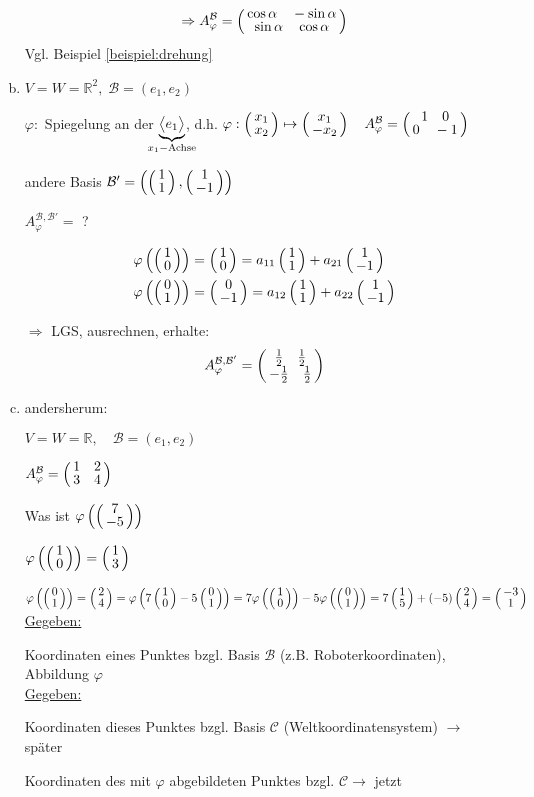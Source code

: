 \begin{enumerate}[a)]
	\[\Rightarrow A_\varphi^\mathcal{B} = \weirdvct{\cos \alpha \quad -\sin \alpha}{\sin \alpha\quad \cos \alpha}\]
	Vgl. Beispiel \ref{beispiel:drehung}
	
	\item
	$V=W=\mathbb{R}^2,\; \mathcal{B} = (e_1,e_2)$
	
	$\varphi:$ Spiegelung an der $\underbrace{\big<e_1\big>}_{\mathclap{x_1-\text{Achse}}}$, d.h. $\varphi:\weirdvct{x_1}{x_2}\mapsto \weirdvct{x_1}{-x_2}\quad
	A_\varphi^\mathcal{B} = \weirdvct{1\quad0}{0\quad-1}$
	
	andere Basis $\mathcal{B}' = \left( \weirdvct{1}{1},\weirdvct{1}{-1} \right)$
	
	$A_\varphi^{\mathcal{B},\mathcal{B}'} =$ ?
	
	\begin{align*}
	\varphi\left(\weirdvct{1}{0}\right) &= \weirdvct{1}{0} = a_{11}\weirdvct{1}{1} + a_{21}\weirdvct{1}{-1}\\
	\varphi\left(\weirdvct{0}{1}\right) &= \weirdvct{0}{-1} = a_{12}\weirdvct{1}{1} + a_{22}\weirdvct{1}{-1}\\
	\end{align*}
	
	$\Rightarrow$ LGS, ausrechnen, erhalte:
	\[A_\varphi^{\mathcal{B},\mathcal{B}'} = \weirdvct{\frac{1}{2}\quad \frac{1}{2}}{-\frac{1}{2}\quad \frac{1}{2}}\]
	
	\item
	andersherum:
	
	$V=W=\mathbb{R}, \quad \mathcal{B}=(e_1,e_2)$
	
	$A_\varphi^\mathcal{B} = \weirdvct{1\quad2}{3\quad4}$
	
	Was ist $\varphi\left(\weirdvct{7}{-5}\right)$
	
	$\varphi\left(\weirdvct{1}{0}\right) = \weirdvct{1}{3}$
	
	$\varphi\left(\weirdvct{0}{1}\right) = \weirdvct{2}{4} = \varphi\left(7 \weirdvct{1}{0} - 5 \weirdvct{0}{1}\right) = 7 \varphi\left(\weirdvct{1}{0}\right) -
	5 \varphi\left(\weirdvct{0}{1}\right) = 7 \weirdvct{1}{5} + (-5) \weirdvct{2}{4} = \weirdvct{-3}{1}$\\
	
	\underline{Gegeben:}
	
	Koordinaten eines Punktes bzgl. Basis $\mathcal{B}$ (z.B. Roboterkoordinaten), Abbildung $\varphi$\\
	
	\underline{Gegeben:}
	
	Koordinaten dieses Punktes bzgl. Basis $\mathcal{C}$ (Weltkoordinatensystem) $\rightarrow$ später
	
	Koordinaten des mit $\varphi$ abgebildeten Punktes bzgl. $\mathcal{C} \rightarrow$ jetzt
	
\end{enumerate}



